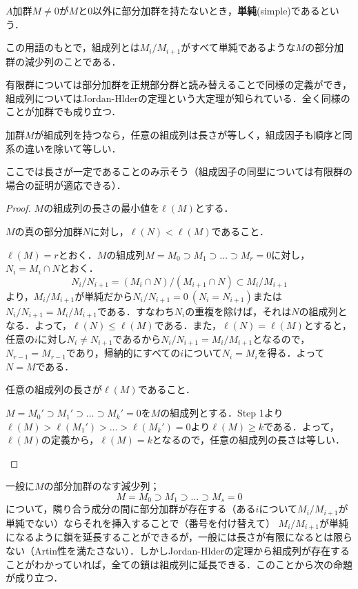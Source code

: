 \begin{defi}[単純加群]
	$A$加群$M\neq0$が$M$と0以外に部分加群を持たないとき，\textbf{単純}(simple)であるという．
\end{defi}

この用語のもとで，組成列とは$M_i/M_{i+1}$がすべて単純であるような$M$の部分加群の減少列のことである．

有限群については部分加群を正規部分群と読み替えることで同様の定義ができ，組成列についてはJordan-Hlderの定理という大定理が知られている．全く同様のことが加群でも成り立つ．

\begin{thm}
	加群$M$が組成列を持つなら，任意の組成列は長さが等しく，組成因子も順序と同系の違いを除いて等しい．
\end{thm}

ここでは長さが一定であることのみ示そう（組成因子の同型については有限群の場合の証明が適応できる）．

\begin{proof}
	$M$の組成列の長さの最小値を$\ell(M)$とする．
	\begin{step}
		\item $M$の真の部分加群$N$に対し，$\ell(N)<\ell(M)$であること．
		
		$\ell(M)=r$とおく．$M$の組成列$M=M_0\supset M_1\supset\dots\supset M_r=0$に対し，$N_i=M_i\cap N$とおく．
		\[N_i/N_{i+1}=(M_i\cap N)/(M_{i+1}\cap N)\subset M_i/M_{i+1}\]
		より，$M_i/M_{i+1}$が単純だから$N_i/N_{i+1}=0~(N_i=N_{i+1})$または$N_i/N_{i+1}=M_i/M_{i+1}$である．すなわち$N_i$の重複を除けば，それは$N$の組成列となる．よって，$\ell(N)\leq\ell(M)$である．また，$\ell(N)=\ell(M)$とすると，任意の$i$に対し$N_i\neq N_{i+1}$であるから$N_i/N_{i+1}=M_i/M_{i+1}$となるので，$N_{r-1}=M_{r-1}$であり，帰納的にすべての$i$について$N_i=M_i$を得る．よって$N=M$である．
		
		\item 任意の組成列の長さが$\ell(M)$であること．
		
		$M={M_0}'\supset{M_1}'\supset\dots\supset{M_k}'=0$を$M$の組成列とする．Step 1より$\ell(M)>\ell({M_1}')>\dots>\ell({M_k}')=0$より$\ell(M)\geq k$である．よって，$\ell(M)$の定義から，$\ell(M)=k$となるので，任意の組成列の長さは等しい．
	\end{step}
\end{proof}

一般に$M$の部分加群のなす減少列；
\[M=M_0\supset M_1\supset\dots\supset M_s=0\]
について，隣り合う成分の間に部分加群が存在する（ある$i$について$M_i/M_{i+1}$が単純でない）ならそれを挿入することで（番号を付け替えて）
$M_i/M_{i+1}$が単純になるように鎖を延長することができるが，一般には長さが有限になるとは限らない（Artin性を満たさない）．しかしJordan-Hlderの定理から組成列が存在することがわかっていれば，全ての鎖は組成列に延長できる．このことから次の命題が成り立つ．

